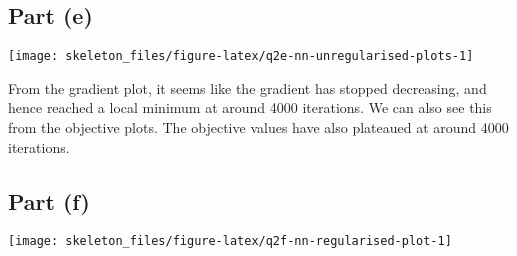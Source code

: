 \documentclass[12pt,halfline,a4paper,]{ouparticle}
\newenvironment{Shaded}{\begin{snugshade}}{\end{snugshade}}
\newcommand{\AttributeTok}[1]{\textcolor[rgb]{0.13,0.29,0.53}{#1}}
\newcommand{\CommentTok}[1]{\textcolor[rgb]{0.56,0.35,0.01}{\textit{#1}}}
\newcommand{\ConstantTok}[1]{\textcolor[rgb]{0.56,0.35,0.01}{#1}}
\newcommand{\DecValTok}[1]{\textcolor[rgb]{0.00,0.00,0.81}{#1}}
\newcommand{\FloatTok}[1]{\textcolor[rgb]{0.00,0.00,0.81}{#1}}
\newcommand{\FunctionTok}[1]{\textcolor[rgb]{0.13,0.29,0.53}{\textbf{#1}}}
\newcommand{\NormalTok}[1]{#1}
\newcommand{\OtherTok}[1]{\textcolor[rgb]{0.56,0.35,0.01}{#1}}
\newcommand{\SpecialCharTok}[1]{\textcolor[rgb]{0.81,0.36,0.00}{\textbf{#1}}}
\begin{document}
\begin{Shaded}
\end{Shaded}

\subsection{Part (e)}\label{part-e}

\texttt{[image: skeleton\_files/figure-latex/q2e-nn-unregularised-plots-1]}

From the gradient plot, it seems like the gradient has stopped
decreasing, and hence reached a local minimum at around 4000 iterations.
We can also see this from the objective plots. The objective values have
also plateaued at around 4000 iterations.

\subsection{Part (f)}\label{part-f}

\texttt{[image: skeleton\_files/figure-latex/q2f-nn-regularised-plot-1]}
\end{document}
